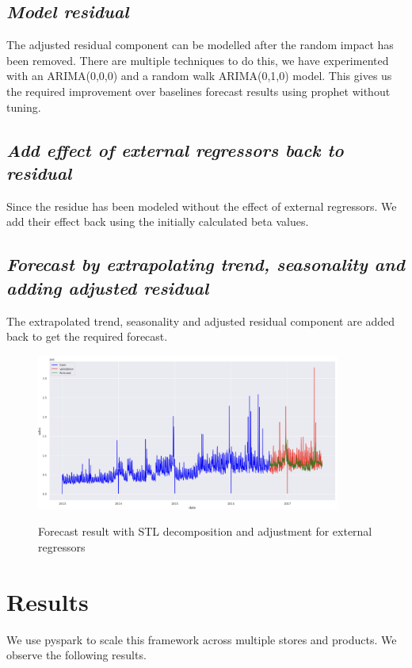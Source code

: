 \documentclass[12pt,a4paper]{cibb}
\begin{document}
\subsection{\bf \it Model residual}
The adjusted residual component can be modelled after the random impact has been removed. There are multiple techniques to do this, we have experimented with an ARIMA(0,0,0) and a random walk ARIMA(0,1,0) model. This gives us the required improvement over baselines forecast results using prophet without tuning.

\subsection{\bf \it Add effect of external regressors back to residual}
Since the residue has been modeled without the effect of external regressors. We add their effect back using the initially calculated beta values.

\subsection{\bf \it Forecast by extrapolating trend, seasonality and adding adjusted residual}
The extrapolated trend, seasonality and adjusted residual component are added back to get the required forecast.

\begin{figure}[h]
\vspace{3mm}
 \begin{center}
{\includegraphics[width=10cm]{forecast_result_stl.png}}
\caption{Forecast result with STL decomposition and adjustment for external regressors}
 \end{center}
 \vspace{-8mm}
\end{figure}


\section{\bf Results}
\label{sec:RESULTS}
We use pyspark to scale this framework across multiple stores and products. We observe the following results.
\end{document}
